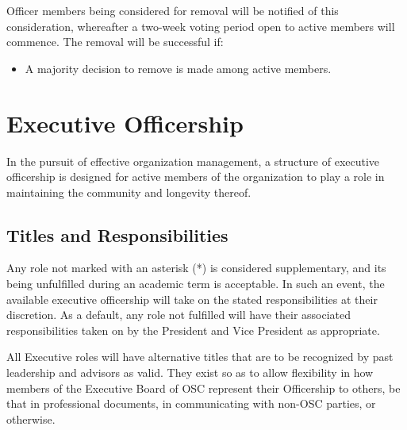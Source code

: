 \documentclass[12pt,letterpaper]{article}
\begin{document}
Officer members being considered for removal will be notified of this consideration,
whereafter a two-week voting period open to active members will commence. The removal will
be successful if:

\begin{itemize}
  \item A  majority decision to remove is made among active members.
\end{itemize}

\section{Executive Officership}

In the pursuit of effective organization management, a structure of executive officership
is designed for active members of the organization to play a role in maintaining the
community and longevity thereof.

\clearpage

\subsection{Titles and Responsibilities}

Any role not marked with an asterisk (*) is considered supplementary, and its being
unfulfilled during an academic term is acceptable. In such an event, the available
executive officership will take on the stated responsibilities at their discretion. As a
default, any role not fulfilled will have their associated responsibilities taken on by
the President and Vice President as appropriate.

All Executive roles will have alternative titles that are to be recognized by past
leadership and advisors as valid. They exist so as to allow flexibility in how members of
the Executive Board of OSC represent their Officership to others, be that in professional
documents, in communicating with non-OSC parties, or otherwise.
\end{document}
